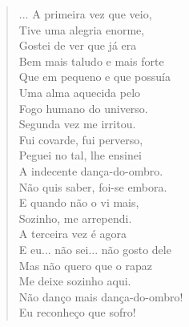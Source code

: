 \begin{verse}
... A primeira vez que veio,\\
Tive uma alegria enorme,\\
Gostei de ver que já era\\
Bem mais taludo e mais forte\\
Que em pequeno e que possuía\\
Uma alma aquecida pelo\\
Fogo humano do universo.\\
Segunda vez me irritou.\\
Fui covarde, fui perverso,\\
Peguei no tal, lhe ensinei\\
A indecente dança-do-ombro.\\
Não quis saber, foi-se embora.\\
E quando não o vi mais,\\
Sozinho, me arrependi.\\
A terceira vez é agora\\
E eu... não sei... não gosto dele\\
Mas não quero que o rapaz\\
Me deixe sozinho aqui.\\
Não danço mais dança-do-ombro!\\
Eu reconheço que sofro!


\end{verse}
